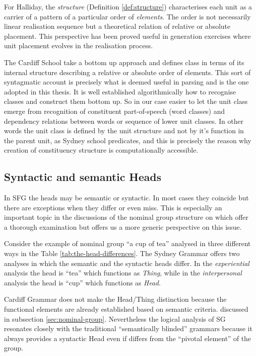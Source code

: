 For Halliday, the \textit{structure} (Definition \ref{def:structure}) characterises each unit as a carrier of a pattern of a particular order of \textit{elements}. The order is not necessarily linear realisation sequence but a theoretical relation of relative or absolute placement. This perspective has been proved useful in generation exercises where unit placement evolves in the realisation process.

The Cardiff School take a bottom up approach and defines class in terms of its internal structure describing a relative or absolute order of elements. This sort of syntagmatic account is precisely what is deemed useful in parsing and is the one adopted in this thesis. It is well established algorithmically how to recognise classes and construct them bottom up. So in our case easier to let the unit class emerge from recognition of constituent part-of-speech (word classes) and dependency relations between words or sequence of lower unit classes. In other words the unit class is defined by the unit structure and not by it's function in the parent unit, as Sydney school predicates, and this is precisely the reason why creation of constituency structure is computationally accessible. 


\subsection{Syntactic and semantic Heads}
In SFG the heads may be semantic or syntactic. In most cases they coincide but there are exceptions when they differ or even miss. This is especially an important topic in the discussions of the nominal group structure on which \citet{Halliday2013} offer a thorough examination but \citet{Fawcett2000} offers us a more generic perspective on this issue.

Consider the example of nominal group ``a cup of tea'' analysed in three different ways in the Table \ref{tab:the-head-differences}. The Sydney Grammar offers two analyses in which the semantic and the syntactic heads differ. In the \textit{experiential} analysis the head is ``tea'' which functions as \textit{Thing}, while in the \textit{interpersonal} analysis the head is ``cup'' which functions as \textit{Head}. 

Cardiff Grammar does not make the Head/Thing distinction because the functional elements are already established based on semantic criteria.  discussed in subsection \ref{sec:nominal-group}. Nevertheless the logical analysis of SG resonates closely with the traditional ``semantically blinded'' grammars because it always provides a syntactic Head even if differs from the ``pivotal element'' of the group.

